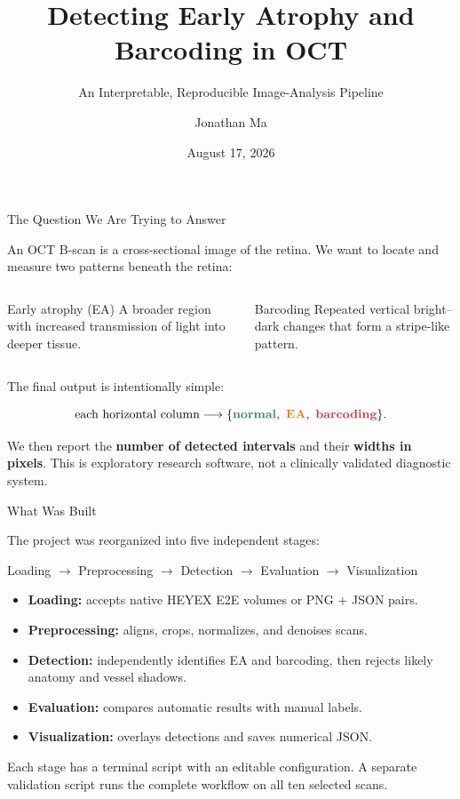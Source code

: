 \documentclass[aspectratio=169]{beamer}
\title{Detecting Early Atrophy and Barcoding in OCT}
\subtitle{An Interpretable, Reproducible Image-Analysis Pipeline}
\author{Jonathan Ma}
\institute{Johns Hopkins University}
\date{August 17, 2026}
\newcommand{\EA}{\textcolor{eacolor}{\textbf{EA}}}
\newcommand{\Barcode}{\textcolor{barcodecolor}{\textbf{barcoding}}}
\newcommand{\Normal}{\textcolor{normalcolor}{\textbf{normal}}}
\begin{document}
\begin{frame}
    \titlepage
\end{frame}

\begin{frame}{The Question We Are Trying to Answer}

An OCT B-scan is a cross-sectional image of the retina. We want to locate and
measure two patterns beneath the retina:

\begin{columns}[T]
\begin{block}{Early atrophy (EA)}
A broader region with increased transmission of light into deeper tissue.
\end{block}

\begin{block}{Barcoding}
Repeated vertical bright--dark changes that form a stripe-like pattern.
\end{block}
\end{columns}

\vspace{0.4cm}

The final output is intentionally simple:

\[
\text{each horizontal column}
\longrightarrow
\{\Normal,\ \EA,\ \Barcode\}.
\]

We then report the \textbf{number of detected intervals} and their
\textbf{widths in pixels}. This is exploratory research software, not a
clinically validated diagnostic system.

\end{frame}

\begin{frame}{What Was Built}

The project was reorganized into five independent stages:

\begin{center}
\Large
Loading $\rightarrow$ Preprocessing $\rightarrow$ Detection
$\rightarrow$ Evaluation $\rightarrow$ Visualization
\end{center}

\vspace{0.35cm}

\begin{itemize}
    \item \textbf{Loading:} accepts native HEYEX E2E volumes or PNG + JSON pairs.
    \item \textbf{Preprocessing:} aligns, crops, normalizes, and denoises scans.
    \item \textbf{Detection:} independently identifies EA and barcoding, then
    rejects likely anatomy and vessel shadows.
    \item \textbf{Evaluation:} compares automatic results with manual labels.
    \item \textbf{Visualization:} overlays detections and saves numerical JSON.
\end{itemize}

Each stage has a terminal script with an editable configuration. A separate
validation script runs the complete workflow on all ten selected scans.

\end{frame}
\end{document}
